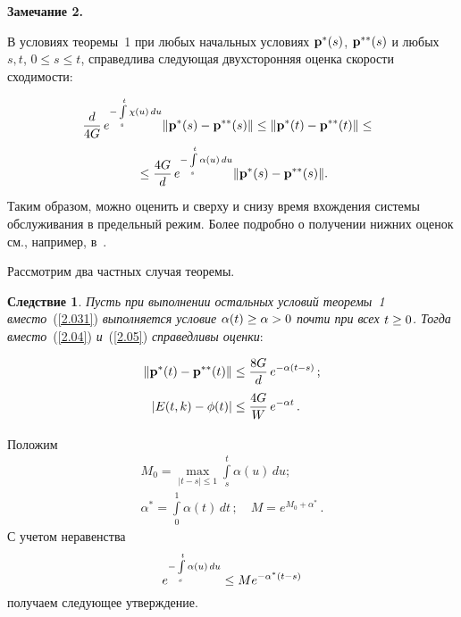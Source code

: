 \begin{multicols}{2}
\noindent
\textbf{Замечание 2.} {В условиях теоремы~1 при любых начальных условиях 
${\bf p^*}(s)$, ${\bf p^{**}}(s)$ и любых $s,t$,  $0\le s\le t$, 
справедлива следующая двухсторонняя оценка скорости сходимости:

\vspace*{-1pt}

\noindent
\begin{multline*} 
\!\!\!\displaystyle\frac{\displaystyle d\mathstrut}{\displaystyle 4G\mathstrut}\,e^{-\int\limits_s^t {\chi(u)\,du}}\|{\mathbf p}^*(s)-{\mathbf p}^{**}(s)\| \le
 \|{\mathbf p}^*(t)-{\mathbf p}^{**}(t)\| \le {}\\
 {}\le\displaystyle\frac{\displaystyle 4G\mathstrut}{\displaystyle d\mathstrut}\,e^{-\int\limits_s^t {\alpha(u)\,du}}\|{\mathbf p}^*(s)-{\mathbf p}^{**}(s)\|.
\end{multline*}
Таким образом, можно оценить и сверху и снизу время  вхождения 
сис\-те\-мы обслуживания в предельный режим. Более подробно о получении 
нижних оценок см., например, в~\cite{z95b, gz05}.}

\smallskip

Рассмотрим два частных случая теоремы.

\smallskip

\noindent
\textbf{Следствие 1}. \textit{Пусть при выполнении остальных условий теоремы~1 
вместо}~(\ref{2.031}) \textit{выполняется условие $\alpha(t) \hm\ge \alpha \hm> 0$ 
почти при всех $t \hm\ge 0$. Тогда вместо}~(\ref{2.04}) \textit{и}~(\ref{2.05}) 
\textit{справедливы оценки}:

\vspace*{-1pt}

\noindent
\begin{align*} 
\|{\mathbf p}^*(t)-{\mathbf p}^{**}(t)\| &\le \displaystyle\frac{\displaystyle 8G\mathstrut}{\displaystyle d\mathstrut}\,e^{-\alpha \left(t-s\right)}\,;
\\
|E(t,k)-\phi(t)|&\le \displaystyle\frac{\displaystyle 4G\mathstrut}{\displaystyle W\mathstrut}\,e^{- \alpha t}\,.
\end{align*}

\pagebreak


Положим 
\begin{gather*}
M_0=\max\limits_{|t-s|\le 1}\int\limits_s^t \alpha(u)\,du;\\
\alpha^* = \int\limits_0^1 \alpha(t)\, dt\,; \quad
M=e^{M_0+\alpha^*}\,.
\end{gather*}
С учетом неравенства 
$$
e^{-\int\limits_s^t {\alpha(u)\,du}} \hm\le M e^{-\alpha^* (t-s)}
$$ 
получаем следующее утверждение.

\smallskip


\end{multicols}
